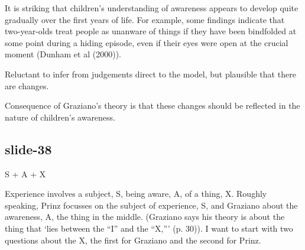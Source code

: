 \documentclass[14pt,\papersize]{extarticle}
\begin{document}
            

            
 
 
It is striking that children’s understanding of awareness appears to 
develop quite gradually over the first years of life.
For example, some findings indicate that two-year-olds treat
people as unanware of things if they have been bindfolded at some point
during a hiding episode, even if their eyes were open at the crucial 
moment (Dunham et al (2000)).
 
Reluctant to infer from judgements direct to the model, but plausible 
that there are changes.
 
Consequence of Graziano's theory is that these changes should be reflected
in the nature of children’s awareness.
 
\subsection{slide-38}
S + A + X
 
Experience involves a subject, S, being aware, A, of a thing, X.
Roughly speaking, 
Prinz focusses on the subject of experience, S,
and Graziano about the awareness, A, the thing in the middle.
(Graziano says his theory is about the thing that ‘lies between the “I” and 
the “X,”’ (p. 30)).
I want to start with two questions about the X, the first for Graziano
and the second for Prinz.
 

    

 






\end{document}
